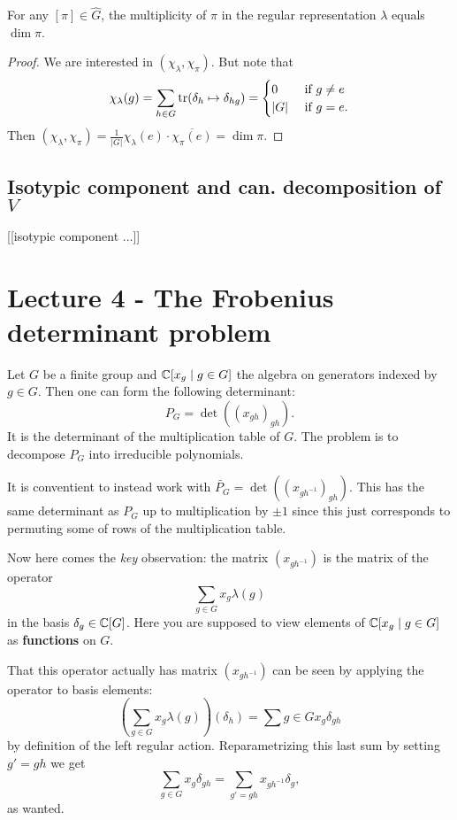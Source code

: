 \documentclass[11pt, english]{article}
\begin{document}
\begin{corr}
 For any $[\pi] \in \widehat G$, the multiplicity of $\pi$ in the regular representation $\lambda$ equals $\dim \pi$.
\end{corr}
\begin{proof}
 We are interested in $(\chi_\lambda, \chi_\pi)$. But note that
$$
\chi_\lambda(g) = \sum_{h \in G} \operatorname{tr} ( \delta_h \mapsto \delta_{hg} ) = \begin{cases} 0 & \text{ if } g \neq e \\
\lvert G \rvert & \text{ if } g = e.
\end{cases}
$$
Then $(\chi_\lambda,\chi_\pi) = \frac{1}{\lvert G \rvert} \chi_\lambda(e) \cdot \overline{\chi_\pi(e)} = \dim \pi$.
\end{proof}

\subsection{Isotypic component and can. decomposition of $V$}

[[isotypic component ...]]

\section{Lecture 4 - The Frobenius determinant problem}

Let $G$ be a finite group and $\mathbb{C}[x_g \mid g \in G]$ the algebra on generators indexed by $g \in G$. Then one can form the following determinant:
$$
P_G  = \det \left( (x_{gh})_{gh} \right).
$$
It is the determinant of the multiplication table of $G$. The problem is to decompose $P_G$ into irreducible polynomials.

It is conventient to instead work with $\widetilde{P_G}=\det( {(x_{gh^{-1}})}_{gh})$. This has the same determinant as $P_G$ up to multiplication by $\pm 1$ since this just corresponds to permuting some of rows of the multiplication table.

Now here comes the \emph{key} observation: the matrix $(x_{gh^{-1}})$ is the matrix of the operator 
$$
\sum_{g \in G} x_g \lambda(g)
$$
in the basis $\delta_g \in \mathbb{C}[G]$. Here you are supposed to view elements of $\mathbb{C}[x_g \mid g \in G]$ as \textbf{functions} on $G$.

That this operator actually has matrix $(x_{gh^{-1}})$ can be seen by applying the operator to basis elements:
$$
\left(\sum_{g \in G} x_g \lambda(g)\right)(\delta_h) = \sum{g \in G} x_g \delta_{gh}
$$
by definition of the left regular action. Reparametrizing this last sum by setting $g' = gh$ we get
$$
\sum_{g \in G} x_g \delta_{gh} = \sum_{g' = gh} x_{gh^{-1}} \delta_g,
$$
as wanted.
\end{document}

